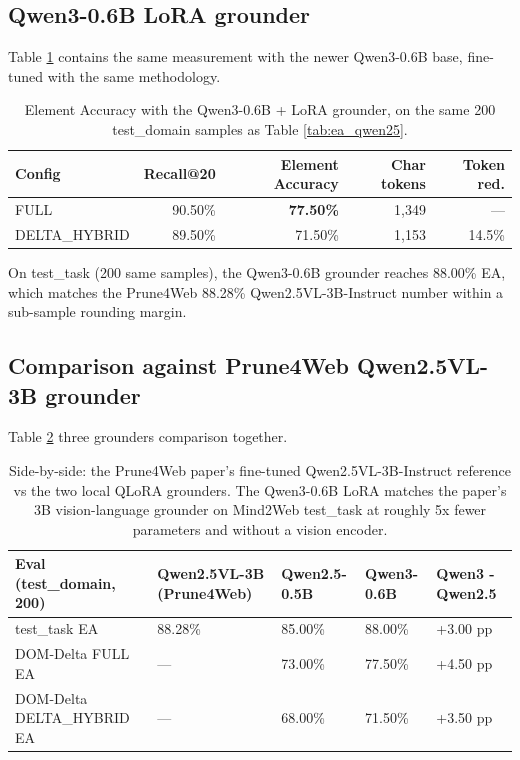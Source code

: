 \subsection{Qwen3-0.6B LoRA grounder}

Table \ref{tab:ea_qwen3} contains the same measurement with the newer Qwen3-0.6B base, fine-tuned with the same methodology.

\begin{table}[h]
\centering
\small
\begin{tabular}{l|r|r|r|r}
\hline
\textbf{Config} & \textbf{Recall@20} & \textbf{Element Accuracy} & \textbf{Char tokens} & \textbf{Token red.} \\
\hline
FULL & 90.50\% & \textbf{77.50\%} & 1{,}349 & --- \\
DELTA\_HYBRID & 89.50\% & 71.50\% & 1{,}153 & 14.5\% \\
\hline
\end{tabular}
\caption{Element Accuracy with the Qwen3-0.6B + LoRA grounder, on the same 200 test\_domain samples as Table \ref{tab:ea_qwen25}.}
\label{tab:ea_qwen3}
\end{table}

On test\_task (200 same samples), the Qwen3-0.6B grounder reaches 88.00\% EA, which matches the Prune4Web 88.28\% Qwen2.5VL-3B-Instruct number within a sub-sample rounding margin.

\subsection{Comparison against Prune4Web Qwen2.5VL-3B grounder}

Table \ref{tab:ea_sidebyside} three grounders comparison together.

\begin{table}[!h]
\small
\centering
\begin{tabularx}{\textwidth}{X|X|X|X|X}
\hline
\textbf{Eval (test\_domain, 200)} & \textbf{Qwen2.5VL-3B (Prune4Web)} & \textbf{Qwen2.5-0.5B} & \textbf{Qwen3-0.6B} & \textbf{Qwen3 - Qwen2.5} \\
\hline
test\_task EA & 88.28\% & 85.00\% & 88.00\% & +3.00 pp \\
DOM-Delta FULL EA & --- & 73.00\% & 77.50\% & +4.50 pp \\
DOM-Delta DELTA\_HYBRID EA & --- & 68.00\% & 71.50\% & +3.50 pp \\
\hline
\end{tabularx}
\caption{Side-by-side: the Prune4Web paper's fine-tuned Qwen2.5VL-3B-Instruct reference \cite{zhang2025prune4web} vs the two local QLoRA grounders. The Qwen3-0.6B LoRA matches the paper's 3B vision-language grounder on Mind2Web test\_task at roughly 5x fewer parameters and without a vision encoder.}
\label{tab:ea_sidebyside}
\end{table}

